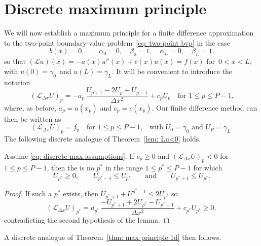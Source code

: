 \section{Discrete maximum principle}

We will now establish a maximum principle for a finite difference approximation 
to the two-point boundary-value problem~\eqref{eq: two-point bvp} in the case
\begin{equation}\label{eq: discrete max assumptions}
b(x)=0,\qquad\alpha_0=0,\quad\beta_0=1,\quad\alpha_L=0,\quad\beta_L=1.
\end{equation}
so that $(\mathcal{L}u)(x)=-a(x)u''(x)+c(x)u(x)=f(x)$ for~$0<x<L$, with
$u(0)=\gamma_0$~and $u(L)=\gamma_L$. It will be convenient to introduce the 
notation
\[
(\mathcal{L}_{\Delta x}U)_p=-a_p\,\frac{U_{p+1}-2U_p+U_{p-1}}{\Delta x^2}
	+c_pU_p\quad\text{for $1\le p\le P-1$,}
\]
where, as before, $a_p=a(x_p)$ and $c_p=c(x_p)$. Our finite difference method 
can then be written as
\begin{equation}\label{eq: finite diff Dirichlet 1d}
(\mathcal{L}_{\Delta x}U)_p=f_p\quad\text{for $1\le p\le P-1$,}\quad
	\text{with $U_0=\gamma_0$ and $U_P=\gamma_L$.}
\end{equation}
The following discrete analogue of Theorem~\ref{lem: Lu<0} holds.

\begin{lemma}\label{lem: discrete LU<0}
Assume \eqref{eq: discrete max assumptions}.
If $c_p\ge0$ and $(\mathcal{L}_{\Delta x}U)_p<0$ for~$1\le p\le P-1$, then
the is no $p^*$ in the range $1\le p^*\le P-1$ for which
\[
U_{p^*}\ge 0,\qquad U_{p^*-1}\le U_{p^*}\qquad\text{and}\qquad
U_{p^*+1}\le U_{p^*}.
\]
\end{lemma}
\begin{proof}
If such a $p^*$ exists, then $U_{p^*+1}+U^{p^*-1}\le 2U_{p^*}$ so
\[
(\mathcal{L}_{\Delta x}U)_{p^*}
	=a_{p^*}\,\frac{-U_{p^*+1}+2U_{p^*}-U_{p^*-1}}{\Delta x^2}
	+c_{p^*}U_{p^*}\ge 0,
\]
contradicting the second hypothesis of the lemma.
\end{proof}

A discrete analogue of Theorem~\ref{thm: max principle 1d} then follows.

